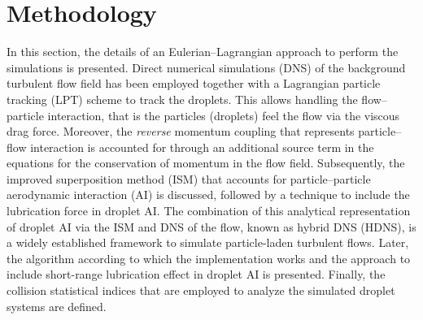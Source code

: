 \documentclass[../thesis.tex]{subfiles}
\begin{document}
\section{Methodology\label{sec:met}}
In this section, the details of an Eulerian--Lagrangian approach to perform the simulations is presented. Direct numerical simulations (DNS) of the background turbulent flow field has been employed together with a Lagrangian particle tracking (LPT) scheme to track the droplets. This  allows handling the flow--particle interaction, that is the particles (droplets) feel the flow via the viscous drag force. Moreover, the \emph{reverse} momentum coupling that represents particle--flow interaction is accounted for through an additional source term in the equations for the conservation of momentum in the flow field. Subsequently, the improved superposition method (ISM) that accounts for particle--particle aerodynamic interaction (AI) is discussed, followed by a technique to include the lubrication force in droplet AI. The combination of this analytical representation of droplet AI via the ISM and DNS of the flow, known as hybrid DNS (HDNS), is a widely established framework to simulate particle-laden turbulent flows. Later, the algorithm according to which the implementation works and the approach to include short-range lubrication effect in droplet AI is presented. Finally, the collision statistical indices that are employed to analyze the simulated droplet systems are defined.
\end{document}
